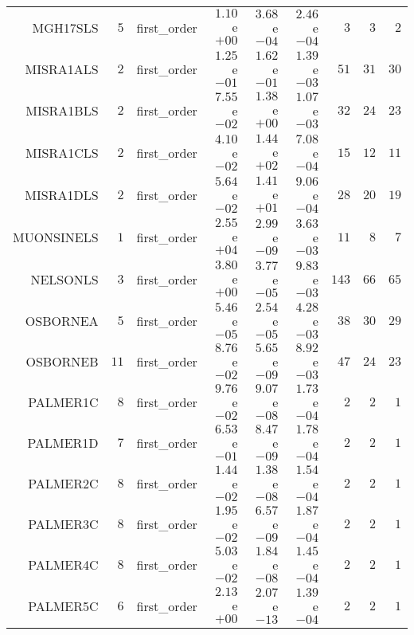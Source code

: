 \begin{longtable}{rrrrrrrrr}
MGH17SLS & \(     5\) & first\_order & \( 1.10\)e\(+00\) & \( 3.68\)e\(-04\) & \( 2.46\)e\(-04\) & \(     3\) & \(     3\) & \(     2\) \\
MISRA1ALS & \(     2\) & first\_order & \( 1.25\)e\(-01\) & \( 1.62\)e\(-01\) & \( 1.39\)e\(-03\) & \(    51\) & \(    31\) & \(    30\) \\
MISRA1BLS & \(     2\) & first\_order & \( 7.55\)e\(-02\) & \( 1.38\)e\(+00\) & \( 1.07\)e\(-03\) & \(    32\) & \(    24\) & \(    23\) \\
MISRA1CLS & \(     2\) & first\_order & \( 4.10\)e\(-02\) & \( 1.44\)e\(+02\) & \( 7.08\)e\(-04\) & \(    15\) & \(    12\) & \(    11\) \\
MISRA1DLS & \(     2\) & first\_order & \( 5.64\)e\(-02\) & \( 1.41\)e\(+01\) & \( 9.06\)e\(-04\) & \(    28\) & \(    20\) & \(    19\) \\
MUONSINELS & \(     1\) & first\_order & \( 2.55\)e\(+04\) & \( 2.99\)e\(-09\) & \( 3.63\)e\(-03\) & \(    11\) & \(     8\) & \(     7\) \\
NELSONLS & \(     3\) & first\_order & \( 3.80\)e\(+00\) & \( 3.77\)e\(-05\) & \( 9.83\)e\(-03\) & \(   143\) & \(    66\) & \(    65\) \\
OSBORNEA & \(     5\) & first\_order & \( 5.46\)e\(-05\) & \( 2.54\)e\(-05\) & \( 4.28\)e\(-03\) & \(    38\) & \(    30\) & \(    29\) \\
OSBORNEB & \(    11\) & first\_order & \( 8.76\)e\(-02\) & \( 5.65\)e\(-09\) & \( 8.92\)e\(-03\) & \(    47\) & \(    24\) & \(    23\) \\
PALMER1C & \(     8\) & first\_order & \( 9.76\)e\(-02\) & \( 9.07\)e\(-08\) & \( 1.73\)e\(-04\) & \(     2\) & \(     2\) & \(     1\) \\
PALMER1D & \(     7\) & first\_order & \( 6.53\)e\(-01\) & \( 8.47\)e\(-09\) & \( 1.78\)e\(-04\) & \(     2\) & \(     2\) & \(     1\) \\
PALMER2C & \(     8\) & first\_order & \( 1.44\)e\(-02\) & \( 1.38\)e\(-08\) & \( 1.54\)e\(-04\) & \(     2\) & \(     2\) & \(     1\) \\
PALMER3C & \(     8\) & first\_order & \( 1.95\)e\(-02\) & \( 6.57\)e\(-09\) & \( 1.87\)e\(-04\) & \(     2\) & \(     2\) & \(     1\) \\
PALMER4C & \(     8\) & first\_order & \( 5.03\)e\(-02\) & \( 1.84\)e\(-08\) & \( 1.45\)e\(-04\) & \(     2\) & \(     2\) & \(     1\) \\
PALMER5C & \(     6\) & first\_order & \( 2.13\)e\(+00\) & \( 2.07\)e\(-13\) & \( 1.39\)e\(-04\) & \(     2\) & \(     2\) & \(     1\) \\

\end{longtable}
